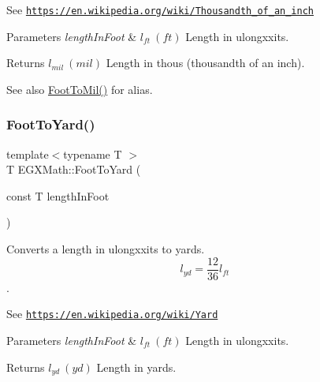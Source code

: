 See \href{https://en.wikipedia.org/wiki/Thousandth_of_an_inch}{\tt https\+://en.\+wikipedia.\+org/wiki/\+Thousandth\+\_\+of\+\_\+an\+\_\+inch} 
\begin{DoxyParams}{Parameters}
{\em length\+In\+Foot} & $ l_{ft}\ (ft)$ Length in ulongxxits. \\
\hline
\end{DoxyParams}
\begin{DoxyReturn}{Returns}
$ l_{mil}\ (mil)$ Length in thous (thousandth of an inch). 
\end{DoxyReturn}
\begin{DoxySeeAlso}{See also}
\mbox{\hyperlink{group___e_g_x_math-_conversions-_length_conversions-_imperial-_foot-_imperial_gab25e7780b3c0429c1a05eafbcbe322a5}{Foot\+To\+Mil()}} for alias. 
\end{DoxySeeAlso}
\mbox{\label{group___e_g_x_math-_conversions-_length_conversions-_imperial-_foot-_imperial_ga19dfde4f9f3e82791f94c713ee3ee2ad}} 
\subsubsection{\texorpdfstring{Foot\+To\+Yard()}{FootToYard()}}
{\footnotesize\ttfamily template$<$typename T $>$ \\
T E\+G\+X\+Math\+::\+Foot\+To\+Yard (\begin{DoxyParamCaption}\item[{const T}]{length\+In\+Foot }\end{DoxyParamCaption})}



Converts a length in ulongxxits to yards. \[ l_{yd}= \frac{12}{36} l_{ft} \]. 

See \href{https://en.wikipedia.org/wiki/Yard}{\tt https\+://en.\+wikipedia.\+org/wiki/\+Yard} 
\begin{DoxyParams}{Parameters}
{\em length\+In\+Foot} & $ l_{ft}\ (ft)$ Length in ulongxxits. \\
\hline
\end{DoxyParams}
\begin{DoxyReturn}{Returns}
$ l_{yd}\ (yd)$ Length in yards. 
\end{DoxyReturn}
